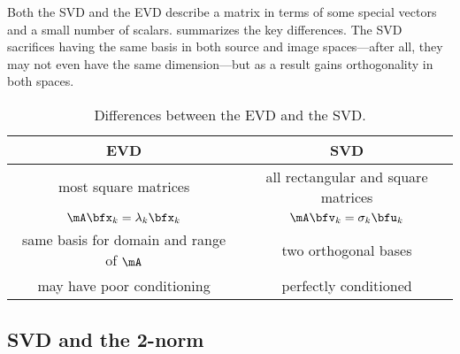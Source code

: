 Both the SVD and the EVD describe a matrix in terms of some special vectors and a small number of scalars.  summarizes the key differences. The SVD sacrifices having the same basis in both source and image spaces---after all, they may not even have the same dimension---but as a result gains orthogonality in both spaces.
\begin{table}[tb]
  \centering
  \caption{Differences between the EVD and the SVD.}
  \label{tab:evdsvd}
  \begin{tabular}{cc}
    \textbf{EVD}  & \textbf{SVD} \\\hline
    most square matrices & all rectangular and square matrices \\
    $\mA\bfx_k = \lambda_k \bfx_k$    &   $\mA \bfv_k = \sigma_k \bfu_k$ \\
    same basis for domain and range of $\mA$ & two orthogonal bases \\
    may have poor conditioning & perfectly conditioned
  \end{tabular}
\end{table}




\subsection{SVD and the 2-norm}


